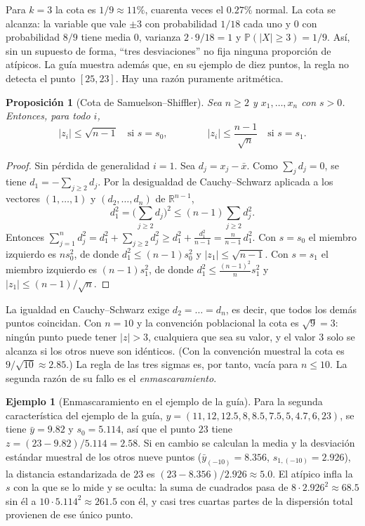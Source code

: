 \documentclass[11pt]{article}
\newtheorem{proposicion}[teorema]{Proposición}
\theoremstyle{definition}
\newtheorem{ejemplo}[teorema]{Ejemplo}
\theoremstyle{remark}
\newcommand{\R}{\mathbb{R}}
\newcommand{\Prob}{\mathbb{P}}
\newcommand{\abs}[1]{\left\lvert #1\right\rvert}
\begin{document}
\noindent Para $k=3$ la cota es $1/9\approx 11\%$, cuarenta veces el $0.27\%$ normal. La cota se alcanza: la variable que vale $\pm3$ con probabilidad $1/18$ cada uno y $0$ con probabilidad $8/9$ tiene media $0$, varianza $2\cdot 9/18=1$ y $\Prob(\abs{X}\ge3)=1/9$. Así, sin un supuesto de forma, ``tres desviaciones'' no fija ninguna proporción de atípicos. La guía muestra además que, en su ejemplo de diez puntos, la regla no detecta el punto $[25,23]$. Hay una razón puramente aritmética.

\begin{proposicion}[Cota de Samuelson--Shiffler]\label{prop:shiffler}
\noindent Sea $n\ge2$ y $x_1,\dots,x_n$ con $s>0$. Entonces, para todo $i$,
\[
\abs{z_i}\le\sqrt{n-1}\quad\text{si }s=s_0,\qquad\qquad \abs{z_i}\le\frac{n-1}{\sqrt n}\quad\text{si }s=s_1.
\]
\end{proposicion}
\begin{proof}
\noindent Sin pérdida de generalidad $i=1$. Sea $d_j=x_j-\bar x$. Como $\sum_jd_j=0$, se tiene $d_1=-\sum_{j\ge2}d_j$. Por la desigualdad de Cauchy--Schwarz aplicada a los vectores $(1,\dots,1)$ y $(d_2,\dots,d_n)$ de $\R^{n-1}$,
\[
d_1^2=\Big(\sum_{j\ge2}d_j\Big)^2\le (n-1)\sum_{j\ge2}d_j^2.
\]
Entonces $\sum_{j=1}^nd_j^2=d_1^2+\sum_{j\ge2}d_j^2\ge d_1^2+\frac{d_1^2}{n-1}=\frac{n}{n-1}\,d_1^2$. Con $s=s_0$ el miembro izquierdo es $ns_0^2$, de donde $d_1^2\le(n-1)s_0^2$ y $\abs{z_1}\le\sqrt{n-1}$. Con $s=s_1$ el miembro izquierdo es $(n-1)s_1^2$, de donde $d_1^2\le\frac{(n-1)^2}{n}s_1^2$ y $\abs{z_1}\le(n-1)/\sqrt n$.
\end{proof}

\noindent La igualdad en Cauchy--Schwarz exige $d_2=\dots=d_n$, es decir, que todos los demás puntos coincidan. Con $n=10$ y la convención poblacional la cota es $\sqrt9=3$: ningún punto puede tener $\abs{z}>3$, cualquiera que sea su valor, y el valor $3$ solo se alcanza si los otros nueve son idénticos. (Con la convención muestral la cota es $9/\sqrt{10}\approx2.85$.) La regla de las tres sigmas es, por tanto, vacía para $n\le10$. La segunda razón de su fallo es el \emph{enmascaramiento}.

\begin{ejemplo}[Enmascaramiento en el ejemplo de la guía]\label{ej:enmascaramiento}
\noindent Para la segunda característica del ejemplo de la guía, $y=(11,12,12.5,8,8.5,7.5,5,4.7,6,23)$, se tiene $\bar y=9.82$ y $s_0=5.114$, así que el punto $23$ tiene $z=(23-9.82)/5.114=2.58$. Si en cambio se calculan la media y la desviación estándar muestral de los otros nueve puntos ($\bar y_{(-10)}=8.356$, $s_{1,(-10)}=2.926$), la distancia estandarizada de $23$ es $(23-8.356)/2.926\approx5.0$. El atípico infla la $s$ con la que se lo mide y se oculta: la suma de cuadrados pasa de $8\cdot2.926^2\approx68.5$ sin él a $10\cdot5.114^2\approx261.5$ con él, y casi tres cuartas partes de la dispersión total provienen de ese único punto.
\end{ejemplo}
\end{document}
